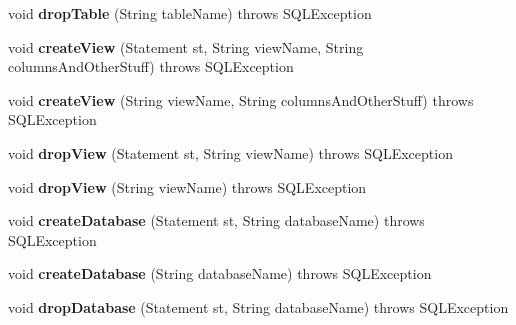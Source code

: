 \begin{DoxyCompactItemize}
\mbox{\label{classtestsuite_1_1_base_test_case_a6c0b307be5e764c26f34b91f6d6a6467}} 
void {\bfseries drop\+Table} (String table\+Name)  throws S\+Q\+L\+Exception 
\item 
\mbox{\label{classtestsuite_1_1_base_test_case_a983df40dad5ef6b021807e9e04cc72b7}} 
void {\bfseries create\+View} (Statement st, String view\+Name, String columns\+And\+Other\+Stuff)  throws S\+Q\+L\+Exception 
\item 
\mbox{\label{classtestsuite_1_1_base_test_case_a283fa00242603070d4f3b90350114b56}} 
void {\bfseries create\+View} (String view\+Name, String columns\+And\+Other\+Stuff)  throws S\+Q\+L\+Exception 
\item 
\mbox{\label{classtestsuite_1_1_base_test_case_a3b274340f82f139a17b459cd34092a63}} 
void {\bfseries drop\+View} (Statement st, String view\+Name)  throws S\+Q\+L\+Exception 
\item 
\mbox{\label{classtestsuite_1_1_base_test_case_a5c3ce4b39ab6ae72b494c165fc53a7d3}} 
void {\bfseries drop\+View} (String view\+Name)  throws S\+Q\+L\+Exception 
\item 
\mbox{\label{classtestsuite_1_1_base_test_case_a19d73ebe2a92f5a1813d92d21fcd6431}} 
void {\bfseries create\+Database} (Statement st, String database\+Name)  throws S\+Q\+L\+Exception 
\item 
\mbox{\label{classtestsuite_1_1_base_test_case_aea6308a3defd8463397b835996508c4e}} 
void {\bfseries create\+Database} (String database\+Name)  throws S\+Q\+L\+Exception 
\item 
\mbox{\label{classtestsuite_1_1_base_test_case_a4f50d8b7e052b9a454a2edc5d4c73cfd}} 
void {\bfseries drop\+Database} (Statement st, String database\+Name)  throws S\+Q\+L\+Exception 
\item 
\mbox{\label{classtestsuite_1_1_base_test_case_aaef6c7d74693cac4684e1fc34a35524b}} 

\end{DoxyCompactItemize}
